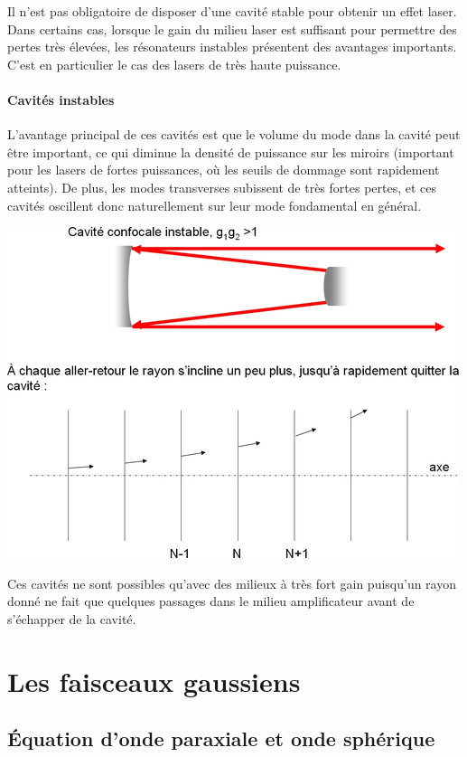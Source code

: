 \documentclass{book}
\begin{document}
Il n'est pas obligatoire de disposer d'une cavité stable pour obtenir un effet laser. Dans certains cas, lorsque le gain du milieu laser est suffisant pour permettre des pertes très élevées, les résonateurs instables présentent des avantages importants. C'est en particulier le cas des lasers de très haute puissance.

\paragraph{Cavités instables}

L'avantage principal de ces cavités est que le volume du mode dans la cavité peut être important, ce qui diminue la densité de puissance sur les miroirs (important pour les lasers de fortes puissances, où les seuils de dommage sont rapidement atteints). De plus, les modes transverses subissent de très fortes pertes, et ces cavités oscillent donc naturellement sur leur mode fondamental en général.

{\centering
\includegraphics[scale=1.7]{images/fig09.jpg}
\par}

Ces cavités ne sont possibles qu'avec des milieux à très fort gain puisqu'un rayon donné ne fait que quelques passages dans le milieu amplificateur avant de s'échapper de la cavité. 

\section{Les faisceaux gaussiens}
\subsection{Équation d'onde paraxiale et onde sphérique}
\end{document}

